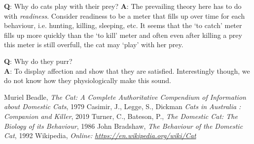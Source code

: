 \documentclass{article}
\begin{document}
\begin{multicols}{3}
\hspace{-2.5cm}
\begin{minipage}{8cm}
    \textbf{Q}: Why do cats play with their prey?
    \textbf{A}: The prevailing theory here has to do with \emph{readiness}. Consider readiness to be a meter that fills up over time for each behaviour, i.e. hunting, killing, sleeping, etc. It seems that the `to catch' meter fills up more quickly than the `to kill' meter and often even after killing a prey this meter is still overfull, the cat may `play' with her prey.\\
    \begin{turn}{90}
    \begin{minipage}[b]{6.5cm}
        \flushleft
        \textbf{Q}: Why do they purr?\\
        \vspace{3cm}
        \flushright
        \textbf{A}: To display affection and show that they are satisfied. Interestingly though, we do not know how they physiologically make this sound.
    \end{minipage}
    \end{turn}
\end{minipage}


\end{multicols}


\printnoidxglossary[style=listdotted]

\begin{thebibliography}{8}
     Muriel Beadle, \emph{The Cat: A Complete Authoritative Compendium of Information about Domestic Cats}, 1979
     Casimir, J., Legge, S., Dickman \emph{Cats in Australia : Companion and Killer}, 2019
     Turner, C., Bateson, P., \emph{The Domestic Cat: The Biology of its Behaviour}, 1986
     John Bradshaw, \emph{The Behaviour of the Domestic Cat}, 1992
     Wikipedia, \emph{Online: \url{https://en.wikipedia.org/wiki/Cat}}
\end{thebibliography}


\fancyfoot[L]{}
\end{document}
